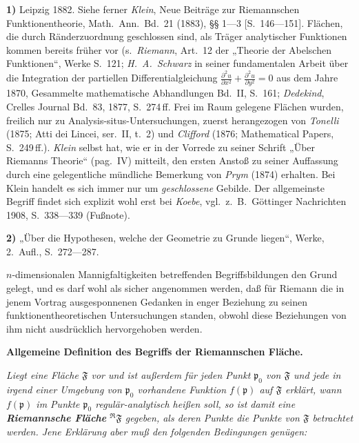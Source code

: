 \documentclass{article}
\begin{document}
\textbf{1)} Leipzig 1882. Siehe ferner \emph{Klein}, Neue Beiträge zur Riemannschen Funktionentheorie, Math.\ Ann.\ Bd.\ 21 (1883), §§ 1---3 [S.\ 146---151]. Flächen, die durch Ränderzuordnung geschlossen sind, als Träger analytischer Funktionen kommen bereits früher vor (s.\ \emph{Riemann}, Art.\ 12 der „Theorie der Abelschen Funktionen“, Werke S.\ 121; \emph{H.~A.~Schwarz} in seiner fundamentalen Arbeit über die Integration der partiellen Differentialgleichung $\frac{\partial^2 u}{\partial x^2} + \frac{\partial^2 u}{\partial y^2} = 0$ aus dem Jahre 1870, Gesammelte mathematische Abhandlungen Bd.\ II, S.\ 161; \emph{Dedekind}, Crelles Journal Bd.\ 83, 1877, S.\ 274\,ff. Frei im Raum gelegene Flächen wurden, freilich nur zu Analysis-situs-Untersuchungen, zuerst herangezogen von \emph{Tonelli} (1875; Atti dei Lincei, ser.\ II, t.\ 2) und \emph{Clifford} (1876; Mathematical Papers, S.\ 249\,ff.). \emph{Klein} selbst hat, wie er in der Vorrede zu seiner Schrift „Über Riemanns Theorie“ (pag.\ IV) mitteilt, den ersten Anstoß zu seiner Auffassung durch eine gelegentliche mündliche Bemerkung von \emph{Prym} (1874) erhalten. Bei Klein handelt es sich immer nur um \emph{geschlossene} Gebilde. Der allgemeinste Begriff findet sich explizit wohl erst bei \emph{Koebe}, vgl.\ z.\ B.\ Göttinger Nachrichten 1908, S.\ 338---339 (Fußnote).

\textbf{2)} „Über die Hypothesen, welche der Geometrie zu Grunde liegen“, Werke, 2.\ Aufl., S.\ 272---287.

$n$-dimensionalen Mannigfaltigkeiten betreffenden Begriffsbildungen den Grund gelegt, und es darf wohl als sicher angenommen werden, daß für Riemann die in jenem Vortrag ausgesponnenen Gedanken in enger Beziehung zu seinen funktionentheoretischen Untersuchungen standen, obwohl diese Beziehungen von ihm nicht ausdrücklich hervorgehoben werden.

\textbf{Allgemeine Definition des Begriffs der Riemannschen Fläche.}

\emph{Liegt eine Fläche $\mathfrak{F}$ vor und ist außerdem für jeden Punkt $\mathfrak{p}_0$ von $\mathfrak{F}$ und jede in irgend einer Umgebung von $\mathfrak{p}_0$ vorhandene Funktion $f(\mathfrak{p})$ auf $\mathfrak{F}$ erklärt, wann $f(\mathfrak{p})$ im Punkte $\mathfrak{p}_0$ regulär-analytisch heißen soll, so ist damit eine \textbf{Riemannsche Fläche} ${}^{\mathfrak{R}}\mathfrak{F}$ gegeben, als deren Punkte die Punkte von $\mathfrak{F}$ betrachtet werden. Jene Erklärung aber muß den folgenden Bedingungen genügen:}
\end{document}
